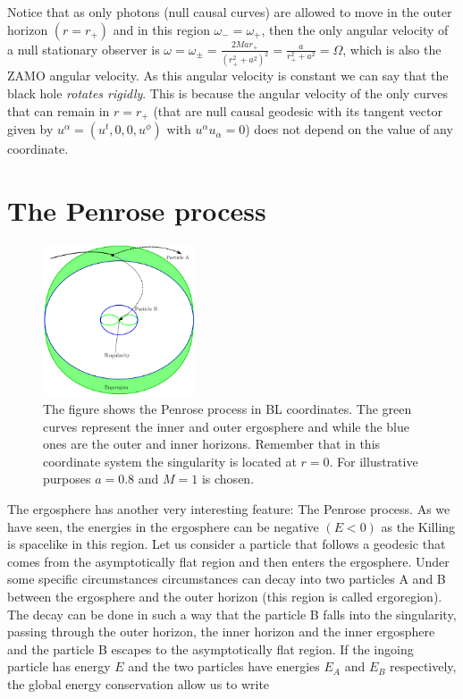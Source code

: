 Notice that as only photons (null causal curves) are allowed to move in the outer horizon $(r=r_+)$ and in this region $\omega_-=\omega_+$, then the only angular velocity of a null stationary observer is $\omega=\omega_\pm=\frac{2 M a r_+}{(r_+^2 + a^2)^2}=\frac{a}{r_+^2+a^2}=\Omega$, which is also the \gls{ZAMO} angular velocity. As this angular velocity is constant we can say that the black hole \textit{rotates rigidly}. This is because the angular velocity of the only curves that can remain in $r=r_+$ (that are null causal geodesic with its tangent vector given by $u^\alpha=(u^t,0,0,u^\phi)$ with $u^\alpha u_\alpha=0$) does not depend on the value of any coordinate.

\section{The Penrose process}
  \begin{figure}[htp!]  
\begin{center}
 \centerline{\includegraphics[width=0.4\textwidth]{img/Chapter0/Penrose.png}}
 \end{center}
 \caption{The figure shows the Penrose process in \gls{BL} coordinates. The green curves represent the inner and outer ergosphere and while the blue ones are the outer and inner horizons. Remember that in this coordinate system the singularity is located at $r=0$. For illustrative purposes $a=0.8$ and $M=1$ is chosen.}
 \label{fig:penroprocc}
\end{figure} 
The ergosphere has another very interesting feature: The Penrose process. As we have seen, the energies in the ergosphere can be negative $(E<0)$ as the Killing is spacelike in this region. Let us consider a particle that follows a geodesic that comes from the asymptotically flat region and then enters the ergosphere. Under some specific circumstances circumstances can decay into two particles A and B between the ergosphere and the outer horizon (this region is called ergoregion). The decay can be done in such a way that the particle B falls into the singularity, passing through the outer horizon, the inner horizon and the inner ergosphere and the particle B escapes to the asymptotically flat region. If the ingoing particle has energy $E$ and the two particles have energies $E_A$ and $E_B$ respectively, the global energy conservation allow us to write
